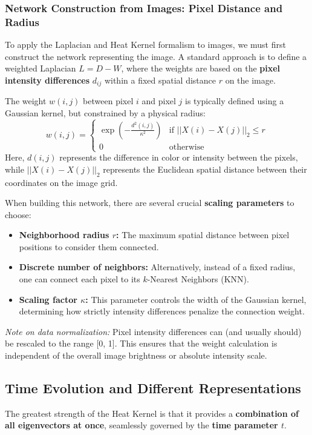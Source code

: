 \subsubsection{Network Construction from Images: Pixel Distance and Radius}
To apply the Laplacian and Heat Kernel formalism to images, we must first construct the network representing the image. A standard approach is to define a weighted Laplacian \( L = D - W \), where the weights are based on the \textbf{pixel intensity differences} \( d_{ij} \) within a fixed spatial distance \( r \) on the image.

The weight \( w(i,j) \) between pixel \( i \) and pixel \( j \) is typically defined using a Gaussian kernel, but constrained by a physical radius:
\[
    w(i,j) =
    \begin{cases}
        \exp\left(-\frac{d^2(i,j)}{\kappa^2}\right) & \text{if } ||X(i) - X(j)||_2 \leqslant r \\
        0                                           & \text{otherwise}
    \end{cases}
\]
Here, \( d(i,j) \) represents the difference in color or intensity between the pixels, while \( ||X(i) - X(j)||_2 \) represents the Euclidean spatial distance between their coordinates on the image grid.

When building this network, there are several crucial \textbf{scaling parameters} to choose:
\begin{itemize}
    \item \textbf{Neighborhood radius \( r \):} The maximum spatial distance between pixel positions to consider them connected.
    \item \textbf{Discrete number of neighbors:} Alternatively, instead of a fixed radius, one can connect each pixel to its \( k \)-Nearest Neighbors (KNN).
    \item \textbf{Scaling factor \( \kappa \):} This parameter controls the width of the Gaussian kernel, determining how strictly intensity differences penalize the connection weight.
\end{itemize}

\textit{Note on data normalization:} Pixel intensity differences can (and usually should) be rescaled to the range [0, 1]. This ensures that the weight calculation is independent of the overall image brightness or absolute intensity scale.

\subsection{Time Evolution and Different Representations}
The greatest strength of the Heat Kernel is that it provides a \textbf{combination of all eigenvectors at once}, seamlessly governed by the \textbf{time parameter \( t \)}.


